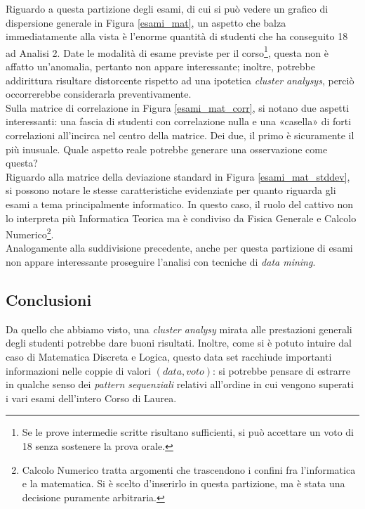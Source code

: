                 Riguardo a questa partizione degli esami, di cui si può vedere un grafico di dispersione generale in Figura \ref{esami_mat}, un aspetto che balza immediatamente alla vista è l’enorme quantità di studenti che ha conseguito 18 ad Analisi 2. Date le modalità di esame previste per il corso\footnote{Se le prove intermedie scritte risultano sufficienti, si può accettare un voto di 18 senza sostenere la prova orale.}, questa non è affatto un'anomalia, pertanto non appare interessante; inoltre, potrebbe addirittura risultare distorcente rispetto ad una ipotetica \textit{cluster analysys}, perciò occorrerebbe considerarla preventivamente.\\

                Sulla matrice di correlazione in Figura \ref{esami_mat_corr}, si notano due aspetti interessanti: una fascia di studenti con correlazione nulla e una «casella» di forti correlazioni all’incirca nel centro della matrice. Dei due, il primo è sicuramente il più inusuale. Quale aspetto reale potrebbe generare una osservazione come questa?\\

                Riguardo alla matrice della deviazione standard in Figura \ref{esami_mat_stddev}, si possono notare le stesse caratteristiche evidenziate per quanto riguarda gli esami a tema principalmente informatico. In questo caso, il ruolo del cattivo non lo interpreta più Informatica Teorica ma è condiviso da Fisica Generale e Calcolo Numerico\footnote{Calcolo Numerico tratta argomenti che trascendono i confini fra l’informatica e la matematica. Si è scelto d'inserirlo in questa partizione, ma è stata una decisione puramente arbitraria.}.\\

                Analogamente alla suddivisione precedente, anche per questa partizione di esami non appare interessante proseguire l'analisi con tecniche di \textit{data mining}.

        \subsection{Conclusioni}

            Da quello che abbiamo visto, una \textit{cluster analysy} mirata alle prestazioni generali degli studenti potrebbe dare buoni risultati. Inoltre, come si è potuto intuire dal caso di Matematica Discreta e Logica, questo data set racchiude importanti informazioni nelle coppie di valori $(data, voto)$: si potrebbe pensare di estrarre in qualche senso dei \textit{pattern sequenziali} relativi all'ordine in cui vengono superati i vari esami dell'intero Corso di Laurea. \\

